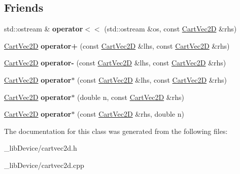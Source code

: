 \subsection*{Friends}
\begin{DoxyCompactItemize}
\item 
std\+::ostream \& {\bfseries operator$<$$<$} (std\+::ostream \&os, const \hyperlink{class_cart_vec2_d}{Cart\+Vec2D} \&rhs)\hypertarget{class_cart_vec2_d_a9b8a3e8f8c11b0b30560a2ecc6996eb0}{}\label{class_cart_vec2_d_a9b8a3e8f8c11b0b30560a2ecc6996eb0}

\item 
\hyperlink{class_cart_vec2_d}{Cart\+Vec2D} {\bfseries operator+} (const \hyperlink{class_cart_vec2_d}{Cart\+Vec2D} \&lhs, const \hyperlink{class_cart_vec2_d}{Cart\+Vec2D} \&rhs)\hypertarget{class_cart_vec2_d_a221f353e4cc614c6220d4b9362082e1d}{}\label{class_cart_vec2_d_a221f353e4cc614c6220d4b9362082e1d}

\item 
\hyperlink{class_cart_vec2_d}{Cart\+Vec2D} {\bfseries operator-\/} (const \hyperlink{class_cart_vec2_d}{Cart\+Vec2D} \&lhs, const \hyperlink{class_cart_vec2_d}{Cart\+Vec2D} \&rhs)\hypertarget{class_cart_vec2_d_a596a5c2c5a21d5cb423b81b3434a508e}{}\label{class_cart_vec2_d_a596a5c2c5a21d5cb423b81b3434a508e}

\item 
\hyperlink{class_cart_vec2_d}{Cart\+Vec2D} {\bfseries operator$\ast$} (const \hyperlink{class_cart_vec2_d}{Cart\+Vec2D} \&lhs, const \hyperlink{class_cart_vec2_d}{Cart\+Vec2D} \&rhs)\hypertarget{class_cart_vec2_d_a6eb8393d1dae60c826374b058caeac4c}{}\label{class_cart_vec2_d_a6eb8393d1dae60c826374b058caeac4c}

\item 
\hyperlink{class_cart_vec2_d}{Cart\+Vec2D} {\bfseries operator$\ast$} (double n, const \hyperlink{class_cart_vec2_d}{Cart\+Vec2D} \&rhs)\hypertarget{class_cart_vec2_d_aaf50bea49ba3f5c0b50aa0151a78d464}{}\label{class_cart_vec2_d_aaf50bea49ba3f5c0b50aa0151a78d464}

\item 
\hyperlink{class_cart_vec2_d}{Cart\+Vec2D} {\bfseries operator$\ast$} (const \hyperlink{class_cart_vec2_d}{Cart\+Vec2D} \&rhs, double n)\hypertarget{class_cart_vec2_d_a5b2381590093015b51800138fe859ec7}{}\label{class_cart_vec2_d_a5b2381590093015b51800138fe859ec7}

\end{DoxyCompactItemize}


The documentation for this class was generated from the following files\+:\begin{DoxyCompactItemize}
\item 
\+\_\+lib\+Device/cartvec2d.\+h\item 
\+\_\+lib\+Device/cartvec2d.\+cpp\end{DoxyCompactItemize}
